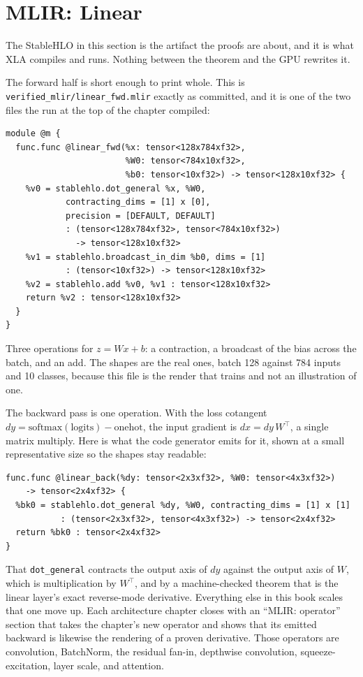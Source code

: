 \section{MLIR: Linear}

The StableHLO in this section is the artifact the proofs are about, and
it is what XLA compiles and runs. Nothing between the theorem and the GPU
rewrites it.

The forward half is short enough to print whole. This is
\texttt{verified\_mlir/linear\_fwd.mlir} exactly as committed, and it is
one of the two files the run at the top of the chapter compiled:

\begin{verbatim}
module @m {
  func.func @linear_fwd(%x: tensor<128x784xf32>,
                        %W0: tensor<784x10xf32>,
                        %b0: tensor<10xf32>) -> tensor<128x10xf32> {
    %v0 = stablehlo.dot_general %x, %W0,
            contracting_dims = [1] x [0],
            precision = [DEFAULT, DEFAULT]
            : (tensor<128x784xf32>, tensor<784x10xf32>)
              -> tensor<128x10xf32>
    %v1 = stablehlo.broadcast_in_dim %b0, dims = [1]
            : (tensor<10xf32>) -> tensor<128x10xf32>
    %v2 = stablehlo.add %v0, %v1 : tensor<128x10xf32>
    return %v2 : tensor<128x10xf32>
  }
}
\end{verbatim}

Three operations for \(z = Wx + b\): a contraction, a broadcast of the
bias across the batch, and an add. The shapes are the real ones, batch
128 against 784 inputs and 10 classes, because this file is the render
that trains and not an illustration of one.

The backward pass is one operation. With the loss cotangent
$dy = \mathrm{softmax}(\mathrm{logits}) - \text{onehot}$, the input
gradient is $dx = dy\,W^{\!\top}$, a single matrix multiply. Here is
what the code generator emits for it, shown at a small representative
size so the shapes stay readable:

\begin{verbatim}
func.func @linear_back(%dy: tensor<2x3xf32>, %W0: tensor<4x3xf32>)
    -> tensor<2x4xf32> {
  %bk0 = stablehlo.dot_general %dy, %W0, contracting_dims = [1] x [1]
           : (tensor<2x3xf32>, tensor<4x3xf32>) -> tensor<2x4xf32>
  return %bk0 : tensor<2x4xf32>
}
\end{verbatim}

\noindent That \texttt{dot\_general} contracts the output axis of $dy$ against the
output axis of $W$, which is multiplication by $W^{\!\top}$, and by a
machine-checked theorem that is the linear layer's exact reverse-mode
derivative. Everything else in this book scales that one move up. Each
architecture chapter closes with an ``MLIR: operator'' section that takes
the chapter's new operator and shows that its emitted backward is
likewise the rendering of a proven derivative. Those operators are
convolution, BatchNorm, the residual fan-in, depthwise convolution,
squeeze-excitation, layer scale, and attention.

